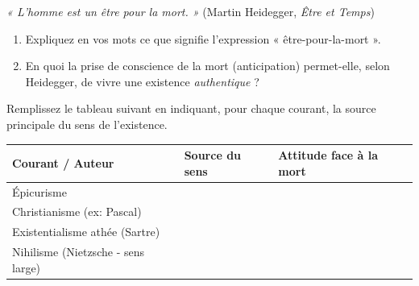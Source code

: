 \documentclass[11pt]{article}
\begin{document}
\begin{exercice}
\textit{« L'homme est un être pour la mort. »} (Martin Heidegger, \textit{Être et Temps})
\begin{enumerate}
    \item Expliquez en vos mots ce que signifie l'expression « être-pour-la-mort ».
    \item En quoi la prise de conscience de la mort (anticipation) permet-elle, selon Heidegger, de vivre une existence \textit{authentique} ?
\end{enumerate}
\end{exercice}

\begin{exercice}
Remplissez le tableau suivant en indiquant, pour chaque courant, la source principale du sens de l'existence.
\begin{center}
\begin{tabular}{|l|p{6cm}|p{6cm}|}
\hline
\textbf{Courant / Auteur} & \textbf{Source du sens} & \textbf{Attitude face à la mort} \\
\hline
Épicurisme &  &  \\
\hline
Christianisme (ex: Pascal) &  &  \\
\hline
Existentialisme athée (Sartre) &  &  \\
\hline
Nihilisme (Nietzsche - sens large) &  &  \\
\hline
\end{tabular}
\end{center}
\end{exercice}
\end{document}
